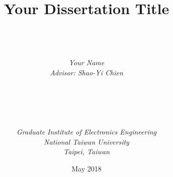 \documentclass[a4paper, 12pt, twoside, openright]{mydissertation}
\begin{document}
\title{\textbf{Your Dissertation Title}}


\author{ \\  \\ \\
{\it Your Name}\\
{\it Advisor: Shao-Yi Chien} \\ \\ \\ \\  \\ \\
{\it Graduate Institute of Electronics Engineering}\\
{\it National Taiwan University} \\
{\it Taipei, Taiwan}\\ }

{\date{May 2018}}

\maketitle

\frontmatter

\tableofcontents
\listoffigures
\listoftables


\mainmatter







\end{document}

